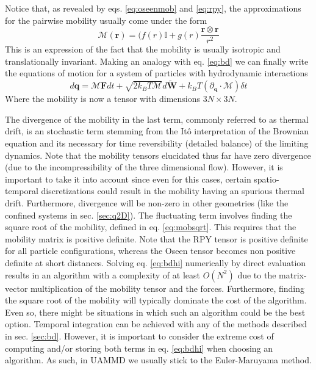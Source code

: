 \documentclass[ twoside,openright,titlepage,numbers=noenddot,%
headinclude,footinclude,cleardoublepage=empty,abstract=on,
BCOR=5mm,paper=a4,fontsize=11pt, dvipsnames
]{scrreprt}
\renewcommand{\vec}[1]{\bm{#1}}
\newcommand{\tens}[1]{\bm{\mathcal{#1}}}
\newcommand{\uammd}{\gls{UAMMD}\xspace}
\newcommand{\dt}{\delta t}
\newcommand{\kT}{k_B T}
\newcommand{\ppos}{q}
\begin{document}
Notice that, as revealed by eqs. \eqref{eq:oseenmob} and \eqref{eq:rpy}, the approximations for the pairwise mobility usually come under the form
\begin{equation}
  \label{eq:bdhimobgeneral}
  \tens{M}(\vec{r}) = (f(r)\mathbb{I} + g(r)\frac{\vec{r}\otimes\vec{r}}{r^2}
\end{equation}
This is an expression of the fact that the mobility is usually isotropic and translationally invariant.
Making an analogy with eq. \eqref{eq:bd} we can finally write the equations of motion for a system of particles with hydrodynamic interactions
\begin{equation}
  \label{eq:bdhi}
  d\vec{\ppos} = \tens{M}\vec{F}dt + \sqrt{2\kT \tens{M}}d\vec{\widetilde{W}} + \kT\left(\partial_{\vec{\ppos}}\cdot\tens{M}\right)\dt
\end{equation}
Where the mobility is now a tensor with dimensions $3N\times 3N$. 

The divergence of the mobility in the last term, commonly referred to as thermal drift, is an stochastic term stemming from the Itô interpretation of the Brownian equation and its necessary for time reversibility (detailed balance) of the limiting dynamics.
Note that the mobility tensors elucidated thus far have zero divergence (due to the incompressibility of the three dimensional flow). However, it is important to take it into account since even for this cases, certain spatio-temporal discretizations could result in the mobility having an spurious thermal drift. Furthermore, divergence will be non-zero in other geometries (like the confined systems in sec. \ref{sec:q2D}). 
The fluctuating term involves finding the square root of the mobility, defined in eq. \eqref{eq:mobsqrt}.
This requires that the mobility matrix is positive definite. Note that the \gls{RPY} tensor is positive definite for all particle configurations, whereas the Oseen tensor becomes non positive definite at short distances.
Solving eq. \eqref{eq:bdhi} numerically by direct evaluation results in an algorithm with a complexity of at least $O(N^2)$ due to the matrix-vector multiplication of the mobility tensor and the forces. Furthermore, finding the square root of the mobility will typically dominate the cost of the algorithm. Even so, there might be situations in which such an algorithm could be the best option.
Temporal integration can be achieved with any of the methods described in sec. \ref{sec:bd}. However, it is important to consider the extreme cost of computing and/or storing both terms in eq. \eqref{eq:bdhi} when choosing an algorithm. As such, in \uammd we usually stick to the Euler-Maruyama method.
\end{document}
